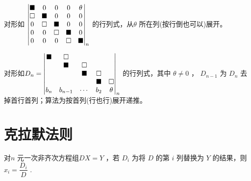 
对形如 $ \begin{vmatrix}
    \blacksquare&0&0&0&\theta\\
    \square&\blacksquare&0&0&0\\
    0&\square&\blacksquare&0&0\\
    0&0&\square&\blacksquare&0\\
    0&0&0&\square&\blacksquare\\
\end{vmatrix}_n $ 的行列式，\nextline 从$ \theta $ 所在列(按行倒也可以)展开。


对形如$ D_n = \begin{vmatrix}
    \blacksquare&\square&&&\\ 
    &\blacksquare&\square&&\\ 
    &&\blacksquare&\square&\\ 
    &&&\blacksquare&\square\\
    b_n&b_{n-1}&\cdots&b_2&\theta
\end{vmatrix}_n $ 的行列式，其中 $ \theta \neq0 $ ，\nextline
$ D_{n-1} $ 为 $ D_n $ 去掉首行首列；算法为按首列(行也行)展开递推。

\section{克拉默法则}

对$ n $ 元一次非齐次方程组$ DX = Y $ ，若 $ D_i $ 为将 $ D $ 的第 $ i $ 列替换为 $ Y $ 的结果，则
$ x_i  = \dfrac{D_i}{D} $ .